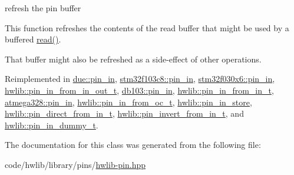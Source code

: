 refresh the pin buffer

This function refreshes the contents of the read buffer that might be used by a buffered \hyperlink{classhwlib_1_1pin__in_ad071bd2e17bb4af51390f6cbb728a194}{read()}.

That buffer might also be refreshed as a side-\/effect of other operations. 

Reimplemented in \hyperlink{classdue_1_1pin__in_aa83ead7fe5283fc95bae295ed1a35bd3}{due\+::pin\+\_\+in}, \hyperlink{classstm32f103c8_1_1pin__in_a9942b1766a4c01d0efcbe893bcd7b62f}{stm32f103c8\+::pin\+\_\+in}, \hyperlink{classstm32f030x6_1_1pin__in_a8d213fc447b0c7e8acf5f331f1c85683}{stm32f030x6\+::pin\+\_\+in}, \hyperlink{classhwlib_1_1pin__in__from__in__out__t_a51580b6d77cfe54dee904c9f567cbc33}{hwlib\+::pin\+\_\+in\+\_\+from\+\_\+in\+\_\+out\+\_\+t}, \hyperlink{classdb103_1_1pin__in_a7581d464f903d09f945b595b3c0f9163}{db103\+::pin\+\_\+in}, \hyperlink{classhwlib_1_1pin__in__from__in__t_ae56094d43a2fe9d38fc52af4cfef4b2c}{hwlib\+::pin\+\_\+in\+\_\+from\+\_\+in\+\_\+t}, \hyperlink{classatmega328_1_1pin__in_a5582f55d2e2d857e941002a7c16cea8f}{atmega328\+::pin\+\_\+in}, \hyperlink{classhwlib_1_1pin__in__from__oc__t_a2c0103a43cb2c3d65d944a645a54a8c6}{hwlib\+::pin\+\_\+in\+\_\+from\+\_\+oc\+\_\+t}, \hyperlink{classhwlib_1_1pin__in__store_a74fdba836b96f7a08327e96b8921e58c}{hwlib\+::pin\+\_\+in\+\_\+store}, \hyperlink{classhwlib_1_1pin__direct__from__in__t_a20c81ad1110ed11c39c4f555c74e7e3a}{hwlib\+::pin\+\_\+direct\+\_\+from\+\_\+in\+\_\+t}, \hyperlink{classhwlib_1_1pin__invert__from__in__t_a6361c3508dd5b7abcc4f6b4953710f95}{hwlib\+::pin\+\_\+invert\+\_\+from\+\_\+in\+\_\+t}, and \hyperlink{classhwlib_1_1pin__in__dummy__t_ab890235f6b613aac58d6aef96d3460a3}{hwlib\+::pin\+\_\+in\+\_\+dummy\+\_\+t}.



The documentation for this class was generated from the following file\+:\begin{DoxyCompactItemize}
\item 
code/hwlib/library/pins/\hyperlink{hwlib-pin_8hpp}{hwlib-\/pin.\+hpp}\end{DoxyCompactItemize}
